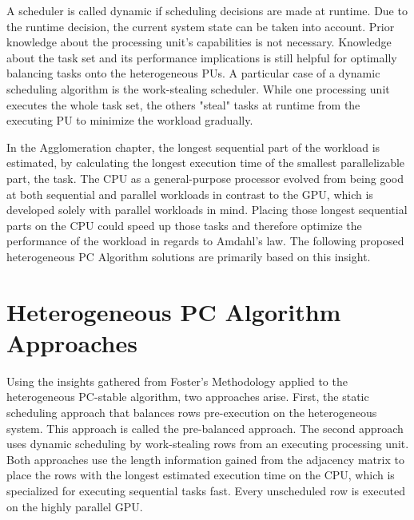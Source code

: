 A scheduler is called dynamic if scheduling decisions are made at runtime. Due to the runtime decision, the current system state can be taken into account. Prior knowledge about the processing unit's capabilities is not necessary. Knowledge about the task set and its performance implications is still helpful for optimally balancing tasks onto the heterogeneous PUs.
A particular case of a dynamic scheduling algorithm is the work-stealing scheduler. While one processing unit executes the whole task set, the others "steal" tasks at runtime from the executing PU to minimize the workload gradually.

In the Agglomeration chapter, the longest sequential part of the workload is estimated, by calculating the longest execution time of the smallest parallelizable part, the task. The CPU as a general-purpose processor evolved from being good at both sequential and parallel workloads in contrast to the GPU, which is developed solely with parallel workloads in mind. Placing those longest sequential parts on the CPU could speed up those tasks and therefore optimize the performance of the workload in regards to Amdahl's law. The following proposed heterogeneous PC Algorithm solutions are primarily based on this insight.

\section{Heterogeneous PC Algorithm Approaches}
Using the insights gathered from Foster's Methodology applied to the heterogeneous PC-stable algorithm, two approaches arise. First, the static scheduling approach that balances rows pre-execution on the heterogeneous system. This approach is called the pre-balanced approach. The second approach uses dynamic scheduling by work-stealing rows from an executing processing unit. Both approaches use the length information gained from the adjacency matrix to place the rows with the longest estimated execution time on the CPU, which is specialized for executing sequential tasks fast. Every unscheduled row is executed on the highly parallel GPU.

